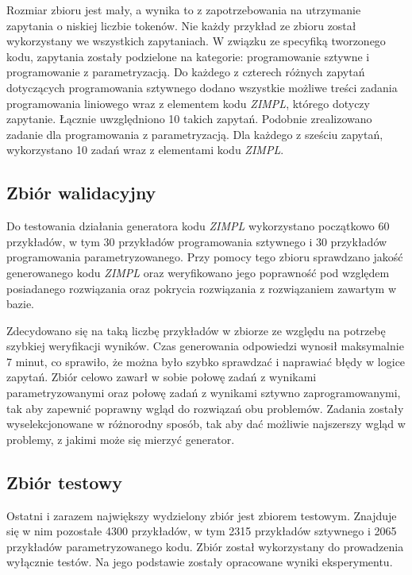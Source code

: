 Rozmiar zbioru jest mały, a wynika to z zapotrzebowania na utrzymanie zapytania o niskiej liczbie tokenów. Nie każdy przykład ze zbioru został wykorzystany we wszystkich zapytaniach. W związku ze specyfiką tworzonego kodu, zapytania zostały podzielone na kategorie: programowanie sztywne i programowanie z parametryzacją. Do każdego z czterech różnych zapytań dotyczących programowania sztywnego dodano wszystkie możliwe treści zadania programowania liniowego wraz z elementem kodu  \textit{ZIMPL}, którego dotyczy zapytanie. Łącznie uwzględniono 10 takich zapytań. Podobnie zrealizowano zadanie dla programowania z parametryzacją. Dla każdego z sześciu zapytań, wykorzystano 10 zadań wraz z elementami kodu  \textit{ZIMPL}.

\subsection{Zbiór walidacyjny}

Do testowania działania generatora kodu  \textit{ZIMPL} wykorzystano początkowo 60 przykładów, w tym 30 przykładów programowania sztywnego i 30 przykładów programowania parametryzowanego. Przy pomocy tego zbioru sprawdzano jakość generowanego kodu  \textit{ZIMPL} oraz weryfikowano jego poprawność pod względem posiadanego rozwiązania oraz pokrycia rozwiązania z rozwiązaniem zawartym w bazie.

Zdecydowano się na taką liczbę przykładów w zbiorze ze względu na potrzebę szybkiej weryfikacji wyników. Czas generowania odpowiedzi wynosił maksymalnie 7 minut, co sprawiło, że można było szybko sprawdzać i naprawiać błędy w logice zapytań. Zbiór celowo zawarł w sobie połowę zadań z wynikami parametryzowanymi oraz połowę zadań z wynikami sztywno zaprogramowanymi, tak aby zapewnić poprawny wgląd do rozwiązań obu problemów. Zadania zostały wyselekcjonowane w różnorodny sposób, tak aby dać możliwie najszerszy wgląd w problemy, z jakimi może się mierzyć generator.

\subsection{Zbiór testowy}

Ostatni i zarazem największy wydzielony zbiór jest zbiorem testowym. Znajduje się w nim pozostałe 4300 przykładów, w tym 2315 przykładów sztywnego i 2065 przykładów parametryzowanego kodu. Zbiór został wykorzystany do prowadzenia wyłącznie testów. Na jego podstawie zostały opracowane wyniki eksperymentu.

